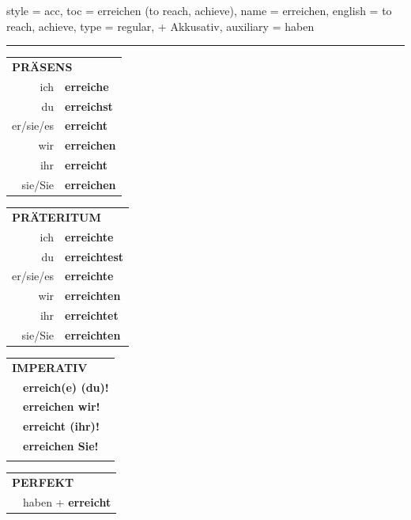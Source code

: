\begin{verbentry}{
  style = {acc},
  toc = {erreichen (to reach, achieve)},
  name = {erreichen},
  english = {to reach, achieve},
  type = {regular, + Akkusativ},
  auxiliary = {haben}
}
 
    
     \vspace{5pt}

    \hrule
    
    \vspace{5pt}

  \begin{tabular}{rl}
     \multicolumn{2}{l}{\textbf{PRÄSENS} }\\
    ich & \textbf{erreiche}\\
    du & \textbf{erreichst}\\
    er/sie/es & \textbf{erreicht}\\
    wir & \textbf{erreichen}\\
    ihr & \textbf{erreicht}\\
    sie/Sie & \textbf{erreichen}\\
  \end{tabular}
  \hfill
     \begin{tabular}{rl}
    \multicolumn{2}{l}{\textbf{PRÄTERITUM} }\\
    ich & \textbf{erreichte}\\
    du & \textbf{erreichtest}\\
    er/sie/es & \textbf{erreichte}\\
    wir & \textbf{erreichten}\\
    ihr & \textbf{erreichtet}\\
    sie/Sie & \textbf{erreichten}\\
  \end{tabular}
  \hfill
  \begin{tabular}{rl}
     \multicolumn{2}{l}{\textbf{IMPERATIV} }\\
   & \textbf{erreich(e) (du)!}\\
   & \textbf{erreichen wir!}\\
   & \textbf{erreicht (ihr)!}\\
   & \textbf{erreichen Sie!}\\
   & \vspace{10pt}
  \end{tabular}

    \vspace{10pt}

 \begin{tabular}{rl}
     \multicolumn{2}{l}{\textbf{PERFEKT}}\\
  &  haben + \textbf{erreicht}\\
  \end{tabular}
\hfill
   \begin{tabular}{rl}
   

\end{tabular}
\end{verbentry}

